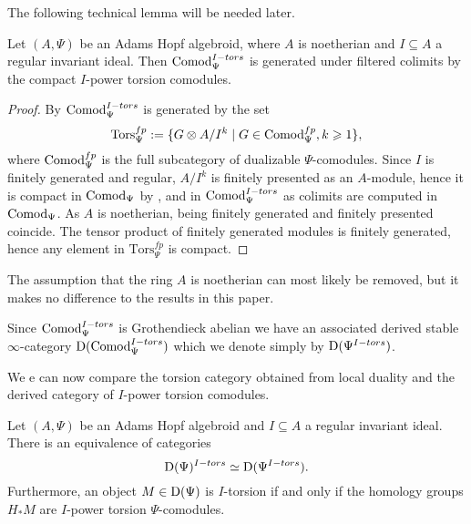 The following technical lemma will be needed later. 

\begin{lemma}
    \label{ch1:lm:torsion-comodules-generated-by-compacts}
    Let $(A,\Psi)$ be an Adams Hopf algebroid, where $A$ is noetherian and $I\subseteq A$ a regular invariant ideal. Then $\mathrm{Comod}_\Psi^{I-tors}$ is generated under filtered colimits by the compact $I$-power torsion comodules. 
\end{lemma}
\begin{proof}
    By \cite[3.4]{barthel-heard-valenzuela_2020} $\mathrm{Comod}_\Psi^{I-tors}$ is generated by the set 
    $$\mathrm{Tors}_\Psi^{fp}:=\{G\otimes A/I^k \mid G \in \mathrm{Comod}_\Psi^{fp}, k\geqslant 1\},$$
    where $\mathrm{Comod}_\Psi^{fp}$ is the full subcategory of dualizable $\Psi$-comodules. Since $I$ is finitely generated and regular, $A/I^k$ is finitely presented as an $A$-module, hence it is compact in $\mathrm{Comod}_\Psi$ by \cite[1.4.2]{hovey_04}, and in $\mathrm{Comod}_\Psi^{I-tors}$ as colimits are computed in $\mathrm{Comod}_\Psi$. As $A$ is noetherian, being finitely generated and finitely presented coincide. The tensor product of finitely generated modules is finitely generated, hence any element in $\mathrm{Tors}_\Psi^{fp}$ is compact. 
\end{proof}

\begin{remark}
    The assumption that the ring $A$ is noetherian can most likely be removed, but it makes no difference to the results in this paper.  
\end{remark}

\begin{notation}
    Since $\mathrm{Comod}_\Psi^{I-tors}$ is Grothendieck abelian we have an associated derived stable $\infty$-category $\mathrm{D}(\mathrm{Comod}_\Psi^{I-tors})$ which we denote simply by $\mathrm{D}(\Psi^{I-tors})$.
\end{notation}

We e can now compare the torsion category obtained from local duality and the derived category of $I$-power torsion comodules. 

\begin{lemma}
    \label{ch1:lm:derived-torsion-if-homology-torsion}
    Let $(A,\Psi)$ be an Adams Hopf algebroid and $I\subseteq A$ a regular invariant ideal. There is an equivalence of categories 
    $$\mathrm{D}(\Psi)^{I-tors}\simeq \mathrm{D}(\Psi^{I-tors}).$$ 
    Furthermore, an object $M\in \mathrm{D}(\Psi)$ is $I$-torsion if and only if the homology groups $H_* M$ are $I$-power torsion $\Psi$-comodules.
\end{lemma}

